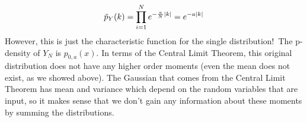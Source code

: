 \documentclass[a4paper,twoside]{article}
\begin{document}
\begin{itemize}
\begin{problem}
            \begin{equation}
                \tilde{p}_{Y}(k) = \prod_{i=1}^{N} e^{- \frac{a}{N} \abs{k}} = e^{- a \abs{k}}
            \end{equation}
            However, this is just the characteristic function for the single distribution!\ The p-density of $ Y_N $ is $ p_{0,a}(x) $. In terms of the Central Limit Theorem, this original distribution does not have any higher order moments (even the mean does not exist, as we showed above). The Gaussian that comes from the Central Limit Theorem has mean and variance which depend on the random variables that are input, so it makes sense that we don't gain any information about these moments by summing the distributions. 
        \end{problem}
\end{itemize}
\end{document}
